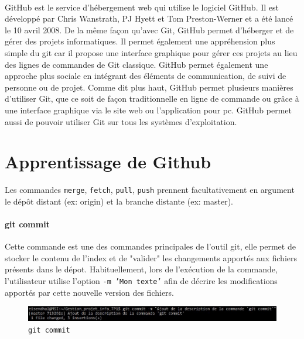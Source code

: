 \documentclass[11pt,canadien]{article}
\begin{document}
\paragraph{} GitHub est le service d'hébergement web qui utilise le logiciel GitHub. Il est développé par Chris Wanstrath, PJ Hyett et Tom Preston-Werner et a été lancé le 10 avril 2008. De la même façon qu'avec Git, GitHub permet d'héberger et de gérer des projets informatiques. Il permet également une appréhension plus simple du git car il propose une interface graphique pour gérer ces projets au lieu des lignes de commandes de Git classique. GitHub permet également une approche plus sociale en intégrant des éléments de communication, de suivi de personne ou de projet. Comme dit plus haut, GitHub permet plusieurs manières d'utiliser Git, que ce soit de façon traditionnelle en ligne de commande ou grâce à une interface graphique via le site web ou l'application pour pc. GitHub permet aussi de pouvoir utiliser Git sur tous les systèmes d'exploitation.

\section{Apprentissage de Github}
Les commandes \texttt{merge}, \texttt{fetch}, \texttt{pull}, \texttt{push} prennent facultativement en argument le dépôt distant (ex: origin) et la branche distante (ex: master).

\paragraph{git commit}Cette commande est une des commandes principales de l'outil git, elle permet de stocker le contenu de l'index et de "valider" les changements apportés aux fichiers présents dans le dépot. Habituellement, lors de l'exécution de la commande, l'utilisateur utilise l'option \texttt{-m 'Mon texte'} afin de décrire les modifications apportés par cette nouvelle version des fichiers.
\begin{figure}
	\centering
	\includegraphics[width=\textwidth]{images/git_commit.jpg}
	\caption{\texttt{git commit}}
	\label{fig:git_commit}
\end{figure}
\end{document}
